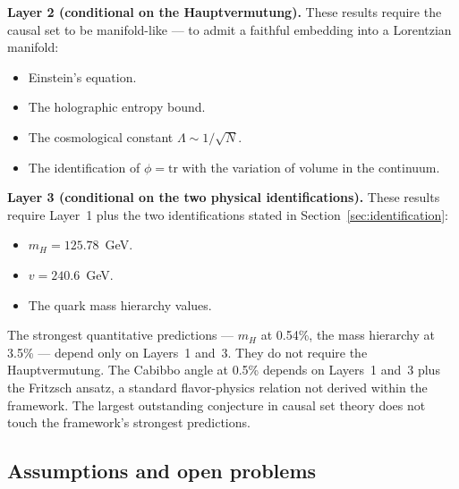 \documentclass[11pt,letterpaper]{article}
\theoremstyle{remark}
\begin{document}
\textbf{Layer 2 (conditional on the Hauptvermutung).} These results
require the causal set to be manifold-like — to admit a faithful
embedding into a Lorentzian manifold:
\begin{itemize}[nosep]
  \item Einstein's equation.
  \item The holographic entropy bound.
  \item The cosmological constant $\Lambda \sim 1/\sqrt{N}$.
  \item The identification of $\phi = \mathrm{tr}$ with the
    variation of volume in the continuum.
\end{itemize}

\textbf{Layer 3 (conditional on the two physical identifications).}
These results require Layer~1 plus the two identifications stated
in Section~\ref{sec:identification}:
\begin{itemize}[nosep]
  \item $m_H = 125.78$~GeV.
  \item $v = 240.6$~GeV.
  \item The quark mass hierarchy values.
\end{itemize}

The strongest quantitative predictions — $m_H$ at 0.54\%, the
mass hierarchy at 3.5\% — depend only on Layers~1 and~3. They do not
require the Hauptvermutung. The Cabibbo angle at 0.5\% depends on
Layers~1 and~3 plus the Fritzsch ansatz, a standard flavor-physics
relation not derived within the framework. The largest outstanding
conjecture in causal set theory does not touch the framework's
strongest predictions.

\subsection{Assumptions and open problems}
\end{document}
